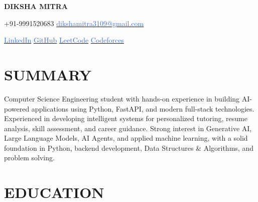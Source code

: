 \documentclass[a4paper,10pt]{article}
\begin{document}

\begin{center}

{\LARGE\textbf{DIKSHA MITRA}}

\vspace{4pt}

+91-9991520683
\hspace{0.4cm}\textbar\hspace{0.4cm}
\href{mailto:dikshamitra3109@gmail.com}{\textcolor{RoyalBlue}{dikshamitra3109@gmail.com}}

\vspace{3pt}

\href{https://www.linkedin.com/in/diksha-mitra-491929365/}{\textcolor{RoyalBlue}{LinkedIn}}
\hspace{0.4cm}\textbar\hspace{0.4cm}
\href{https://github.com/ddikshamitraa25}{\textcolor{RoyalBlue}{GitHub}}
\hspace{0.4cm}\textbar\hspace{0.4cm}
\href{https://leetcode.com/u/ddikshamitraa25/}{\textcolor{RoyalBlue}{LeetCode}}
\hspace{0.4cm}\textbar\hspace{0.4cm}
\href{https://codeforces.com/profile/ddikshamitraa25}{\textcolor{RoyalBlue}{Codeforces}}

\end{center}


\section*{SUMMARY}

Computer Science Engineering student with hands-on experience in building AI-powered applications using Python, FastAPI, and modern full-stack technologies. Experienced in developing intelligent systems for personalized tutoring, resume analysis, skill assessment, and career guidance. Strong interest in Generative AI, Large Language Models, AI Agents, and applied machine learning, with a solid foundation in Python, backend development, Data Structures & Algorithms, and problem solving.


\section*{EDUCATION}
\end{document}
